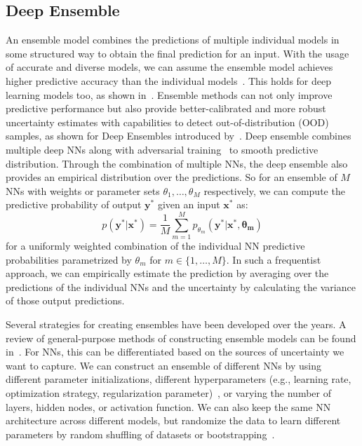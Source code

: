     \subsection{Deep Ensemble}\label{Deepsemble}
    An ensemble model combines the predictions of multiple individual models in some structured way to obtain the final prediction for an input. With the usage of accurate and diverse models, we can assume the ensemble model achieves higher predictive accuracy than the individual models~\cite{EnsembleNN}. This holds for deep learning models too, as shown in~\cite{EnsembleNN, EnsembleNN2, EnsembleNN3}. Ensemble methods can not only improve predictive performance but also provide better-calibrated and more robust uncertainty estimates with capabilities to detect out-of-distribution (OOD) samples, as shown for Deep Ensembles introduced by~\cite{DeepEnsembleUQ}. Deep ensemble combines multiple deep NNs along with adversarial training~\cite{Adversarial} to smooth predictive distribution. Through the combination of multiple NNs, the deep ensemble also provides an empirical distribution over the predictions. So for an ensemble of $M$ NNs with weights or parameter sets $\theta_1, \ldots, \theta_M$ respectively, we can compute the predictive probability of output $\mathbf{y^*}$ given an input $\mathbf{x^*}$ as:
    \begin{equation}\label{EnsemblePred}
        p(\mathbf{y^*|x^*}) = \frac{1}{M} \sum_{m=1}^M p_{\theta_m}(\mathbf{y^*|x^*, \theta_m})
    \end{equation}
    for a uniformly weighted combination of the individual NN predictive probabilities parametrized by $\theta_m$ for $m \in \{1, \ldots, M\}$. In such a frequentist approach, we can empirically estimate the prediction by averaging over the predictions of the individual NNs and the uncertainty by calculating the variance of those output predictions.
    \newline

    Several strategies for creating ensembles have been developed over the years. A review of general-purpose methods of constructing ensemble models can be found in~\cite{EnsembleReview}. For NNs, this can be differentiated based on the sources of uncertainty we want to capture. We can construct an ensemble of different NNs by using different parameter initializations, different hyperparameters (e.g., learning rate, optimization strategy, regularization parameter)~\cite{HyperparEnsUnc}, or varying the number of layers, hidden nodes, or activation function. We can also keep the same NN architecture across different models, but randomize the data to learn different parameters by random shuffling of datasets or bootstrapping~\cite{DeepEnsembleUQ, NeuBoots}.
    \newline

